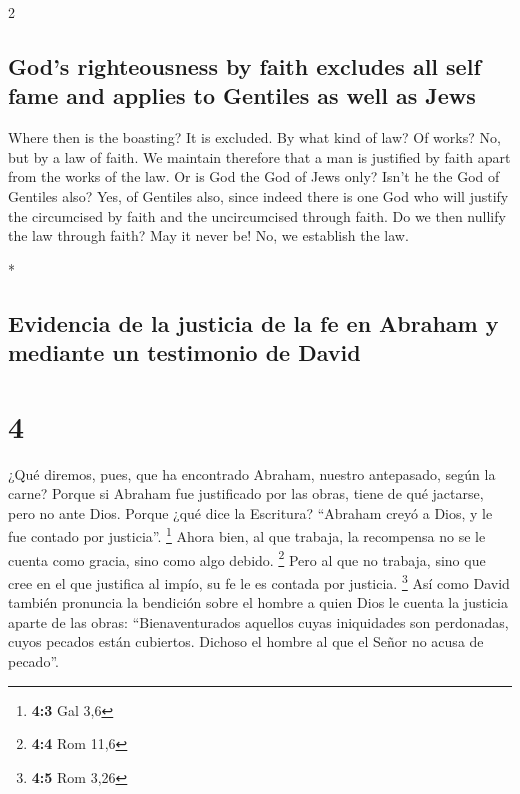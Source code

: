 \begin{paracol}{2}
\begin{otherlanguage}{english}
\hypertarget{gods-righteousness-by-faith-excludes-all-self-fame-and-applies-to-gentiles-as-well-as-jews}{%
\subsection{God's righteousness by faith excludes all self fame and
applies to Gentiles as well as
Jews}\label{gods-righteousness-by-faith-excludes-all-self-fame-and-applies-to-gentiles-as-well-as-jews}}

 Where then is the boasting? It is excluded. By what kind
of law? Of works? No, but by a law of faith.  We maintain
therefore that a man is justified by faith apart from the works of the
law.  Or is God the God of Jews only? Isn't he the God of
Gentiles also? Yes, of Gentiles also,  since indeed there
is one God who will justify the circumcised by faith and the
uncircumcised through faith.  Do we then nullify the law
through faith? May it never be! No, we establish the law.

\end{otherlanguage}

\switchcolumn[0]*

\hypertarget{evidencia-de-la-justicia-de-la-fe-en-abraham-y-mediante-un-testimonio-de-david}{%
\subsection{Evidencia de la justicia de la fe en Abraham y mediante un
testimonio de
David}\label{evidencia-de-la-justicia-de-la-fe-en-abraham-y-mediante-un-testimonio-de-david}}

\hypertarget{section-6}{%
\section{4}\label{section-6}}

 ¿Qué diremos, pues, que ha encontrado Abraham, nuestro
antepasado, según la carne?  Porque si Abraham fue
justificado por las obras, tiene de qué jactarse, pero no ante Dios.
 Porque ¿qué dice la Escritura? ``Abraham creyó a Dios, y
le fue contado por justicia''. \footnote{\textbf{4:3} Gal 3,6}
 Ahora bien, al que trabaja, la recompensa no se le cuenta
como gracia, sino como algo debido. \footnote{\textbf{4:4} Rom 11,6}
 Pero al que no trabaja, sino que cree en el que justifica
al impío, su fe le es contada por justicia. \footnote{\textbf{4:5} Rom
  3,26}  Así como David también pronuncia la bendición
sobre el hombre a quien Dios le cuenta la justicia aparte de las obras:
 ``Bienaventurados aquellos cuyas iniquidades son
perdonadas, cuyos pecados están cubiertos.  Dichoso el
hombre al que el Señor no acusa de pecado''.


\end{paracol}
